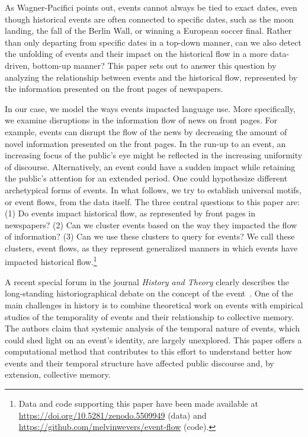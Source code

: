 \documentclass[]{ceurart}
\begin{document}
As Wagner-Pacifici points out, events cannot always be tied to exact dates, even though historical events are often connected to specific dates, such as the moon landing, the fall of the Berlin Wall, or winning a European soccer final. Rather than only departing from specific dates in a top-down manner, can we also detect the unfolding of events and their impact on the historical flow in a more data-driven, bottom-up manner? This paper sets out to answer this question by analyzing the relationship between events and the historical flow, represented by the information presented on the front pages of newspapers.

In our case, we model the ways events impacted language use. More specifically, we examine disruptions in the information flow of news on front pages. For example, events can disrupt the flow of the news by decreasing the amount of novel information presented on the front pages. In the run-up to an event, an increasing focus of the public's eye might be reflected in the increasing uniformity of discourse. Alternatively, an event could have a sudden impact while retaining the public's attention for an extended period. One could hypothesize different archetypical forms of events. In what follows, we try to establish universal motifs, or event flows, from the data itself. The three central questions to this paper are: (1) Do events impact historical flow, as represented by front pages in newspapers? (2) Can we cluster events based on the way they impacted the flow of information? (3) Can we use these clusters to query for events? We call these clusters, event flows, as they represent generalized manners in which events have impacted historical flow.\footnote{Data and code supporting this paper have been made available at \url{https://doi.org/10.5281/zenodo.5509949} (data) and \url{https://github.com/melvinwevers/event-flow} (code).}

A recent special forum in the journal \textit{History and Theory} clearly describes the long-standing historiographical debate on the concept of the event~\cite{jungTimesEventIntroduction2021}. One of the main challenges in history is to combine theoretical work on events with empirical studies of the temporality of events and their relationship to collective memory. The authors claim that systemic analysis of the temporal nature of events, which could shed light on an event's identity, are largely unexplored. This paper offers a computational method that contributes to this effort to understand better how events and their temporal structure have affected public discourse and, by extension, collective memory. 
\end{document}
